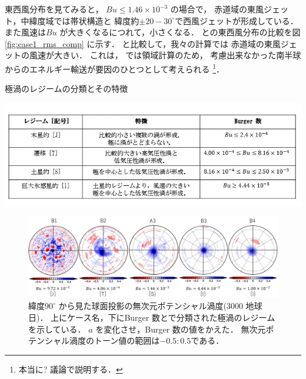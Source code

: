 \documentclass[a4j,12pt,openbib,oneside]{jreport}
\begin{document}
東西風分布を見てみると，
$Bu \leq 1.46 \times 10^{-3} $  の場合で，
赤道域の東風ジェット，中緯度域では帯状構造と
緯度約$\pm 20 - 30^\circ$で西風ジェットが形成している．
また風速は$Bu$ が大きくなるにつれて，小さくなる．
%
\cite{Showman2007} との東西風分布の比較を図\ref{fig:case1_rms_comp} に示す．
\cite{Showman2007} と比較して，我々の計算では
赤道域の東風ジェットの風速が大きい．
これは，\cite{Showman2007} では領域計算のため，
考慮出来なかった南半球からのエネルギー輸送が要因のひとつとして考えられる
\footnote{本当に? 議論で説明する．}．
% 

%
\begin{table}[h]
  \caption{極渦のレジームの分類とその特徴}
  \label{table:regime}
  \begin{center}
    \includegraphics[clip,width=15cm]{./fig/model/table_regime.jpg}
  \end{center}
\end{table}
%
\begin{figure}[ht]
  \begin{center}
    \includegraphics[clip,width=14cm]{./fig/result/case1/case1_nonqv_a.png}
    \caption{
      \footnotesize{緯度$90^\circ$ から見た球面投影の無次元ポテンシャル渦度(3000 地球日)．
上にケース名，下にBurger 数と\cite{Brueshaber2019}で分類された極渦のレジームを示している．
$a$ を変化させ，Burger 数の値をかえた．
無次元ポテンシャル渦度のトーン値の範囲は$-0.5:0.5$である．
      }
    }
    \label{fig:case1_nonqv_a}
  \end{center}
\end{figure}
%
\end{document}
